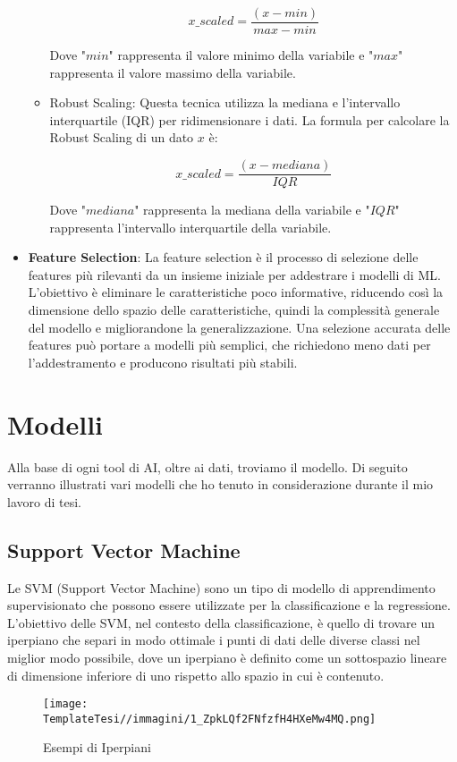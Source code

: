 \begin{flushleft}
\begin{itemize}
\begin{itemize}
       
\[ x\_scaled = \frac{(x - min)}{max - min}\]


    Dove "$min$" rappresenta il valore minimo della variabile e "$max$" rappresenta il valore massimo della variabile. 

    \item Robust Scaling: Questa tecnica utilizza la mediana e l'intervallo interquartile (IQR) per ridimensionare i dati. La formula per calcolare la Robust Scaling di un dato $x$ è:

  
\[  x\_scaled = \frac{(x - mediana)}{IQR}\]


    Dove "$mediana$" rappresenta la mediana della variabile e "$IQR$" rappresenta l'intervallo interquartile della variabile.
    \end{itemize}
    \item \textbf{Feature Selection}:
    La feature selection è il processo di selezione delle features più rilevanti da un insieme iniziale per addestrare i modelli di ML. L'obiettivo è eliminare le caratteristiche poco informative, riducendo così la dimensione dello spazio delle caratteristiche, quindi la complessità generale del modello e migliorandone la generalizzazione. Una selezione accurata delle features può portare a modelli più semplici, che richiedono meno dati per l'addestramento e producono risultati più stabili.
\end{itemize}
\section{Modelli}
Alla base di ogni tool di AI, oltre ai dati, troviamo il modello.
Di seguito verranno illustrati vari modelli che ho tenuto in considerazione durante il mio lavoro di tesi.

\subsection{Support Vector Machine}
Le SVM (Support Vector Machine) sono un tipo di modello di apprendimento supervisionato che possono essere utilizzate per la classificazione e la regressione.
L'obiettivo delle SVM, nel contesto della classificazione, è quello di trovare un iperpiano che separi in modo ottimale i punti di dati delle diverse classi nel miglior modo possibile, dove un iperpiano è definito come un sottospazio lineare di dimensione inferiore di uno rispetto allo spazio in cui è contenuto\cite{def_iperpiano}.
\begin{figure}[H]
    \centering
    \texttt{[image: TemplateTesi//immagini/1\_ZpkLQf2FNfzfH4HXeMw4MQ.png]}
    \caption{Esempi di Iperpiani \cite{imm_svm}}
    \label{fig:enter-label}
\end{figure}\newpage


\end{flushleft}
